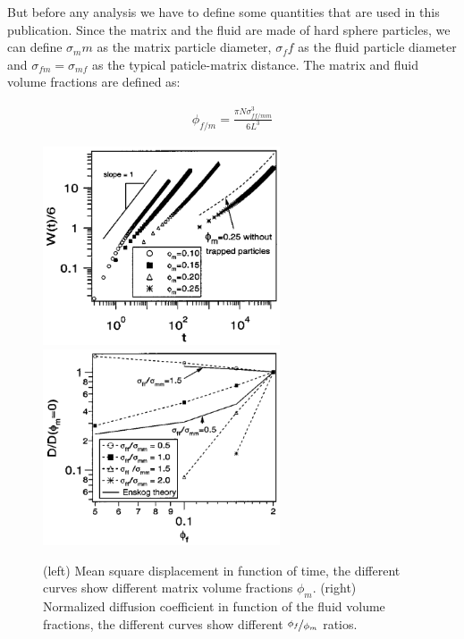 \documentclass[a4paper,12pt]{article}
\begin{document}
But before any analysis we have to define some quantities that are used in this publication. Since the matrix and the fluid are made of hard
sphere particles, we can define $\sigma_mm$ as the matrix particle diameter, $\sigma_ff$ as the fluid particle diameter and $\sigma_{fm} = 
\sigma_{mf}$ as the typical paticle-matrix distance. The matrix and fluid volume fractions are defined as:

\begin{align}
\phi_{f/m} = \frac{\pi N \sigma_{ff/mm}^3}{6L^3}
\end{align}

\begin{figure}[htbp]
\centering
\subfigure
{\includegraphics[width=7cm]{pics/msd_mm.png}}
\subfigure
{\includegraphics[width=7cm]{pics/ndc_mm.png}}
\caption{(left) Mean square displacement in function of time, the different curves show different matrix volume fractions $\phi_m$. (right)
Normalized diffusion coefficient in function of the fluid volume fractions, the different curves show different $\nicefrac{\phi_f}{\phi_m}$
ratios.}
\label{msd ndc mm}
\end{figure}
\end{document}
